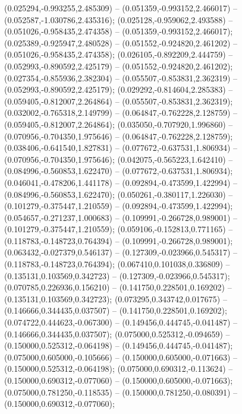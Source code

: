  (0.025294,-0.993255,2.485309) -- (0.051359,-0.993152,2.466017) -- (0.052587,-1.030786,2.435316);
 (0.025128,-0.959062,2.493588) -- (0.051026,-0.958435,2.474358) -- (0.051359,-0.993152,2.466017);
 (0.025389,-0.925947,2.480528) -- (0.051552,-0.924820,2.461202) -- (0.051026,-0.958435,2.474358);
 (0.026105,-0.892209,2.444759) -- (0.052993,-0.890592,2.425179) -- (0.051552,-0.924820,2.461202);
 (0.027354,-0.855936,2.382304) -- (0.055507,-0.853831,2.362319) -- (0.052993,-0.890592,2.425179);
 (0.029292,-0.814604,2.285383) -- (0.059405,-0.812007,2.264864) -- (0.055507,-0.853831,2.362319);
 (0.032002,-0.765318,2.149799) -- (0.064847,-0.762228,2.128759) -- (0.059405,-0.812007,2.264864);
 (0.035050,-0.707920,1.996860) -- (0.070956,-0.704350,1.975646) -- (0.064847,-0.762228,2.128759);
 (0.038406,-0.641540,1.827831) -- (0.077672,-0.637531,1.806934) -- (0.070956,-0.704350,1.975646);
 (0.042075,-0.565223,1.642410) -- (0.084996,-0.560853,1.622470) -- (0.077672,-0.637531,1.806934);
 (0.046041,-0.478206,1.441178) -- (0.092894,-0.473599,1.422994) -- (0.084996,-0.560853,1.622470);
 (0.050261,-0.380117,1.226030) -- (0.101279,-0.375447,1.210559) -- (0.092894,-0.473599,1.422994);
 (0.054657,-0.271237,1.000683) -- (0.109991,-0.266728,0.989001) -- (0.101279,-0.375447,1.210559);
 (0.059106,-0.152813,0.771165) -- (0.118783,-0.148723,0.764394) -- (0.109991,-0.266728,0.989001);
 (0.063432,-0.027379,0.546137) -- (0.127309,-0.023966,0.545317) -- (0.118783,-0.148723,0.764394);
 (0.067410,0.101038,0.336809) -- (0.135131,0.103569,0.342723) -- (0.127309,-0.023966,0.545317);
 (0.070785,0.226936,0.156210) -- (0.141750,0.228501,0.169202) -- (0.135131,0.103569,0.342723);
 (0.073295,0.343742,0.017675) -- (0.146666,0.344435,0.037507) -- (0.141750,0.228501,0.169202);
 (0.074722,0.444623,-0.067300) -- (0.149456,0.444745,-0.041487) -- (0.146666,0.344435,0.037507);
 (0.075000,0.525312,-0.094659) -- (0.150000,0.525312,-0.064198) -- (0.149456,0.444745,-0.041487);
 (0.075000,0.605000,-0.105666) -- (0.150000,0.605000,-0.071663) -- (0.150000,0.525312,-0.064198);
 (0.075000,0.690312,-0.113624) -- (0.150000,0.690312,-0.077060) -- (0.150000,0.605000,-0.071663);
 (0.075000,0.781250,-0.118535) -- (0.150000,0.781250,-0.080391) -- (0.150000,0.690312,-0.077060);
